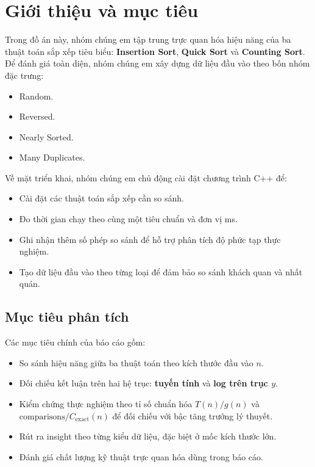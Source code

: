 \section{Giới thiệu và mục tiêu}

Trong đồ án này, nhóm chúng em tập trung trực quan hóa hiệu năng của ba thuật toán sắp xếp tiêu biểu:
\textbf{Insertion Sort}, \textbf{Quick Sort} và \textbf{Counting Sort}.
Để đánh giá toàn diện, nhóm chúng em xây dựng dữ liệu đầu vào theo bốn nhóm đặc trưng:
\begin{itemize}[leftmargin=1.2cm]
    \item Random.
    \item Reversed.
    \item Nearly Sorted.
    \item Many Duplicates.
\end{itemize}

Về mặt triển khai, nhóm chúng em chủ động cài đặt chương trình C++ để:
\begin{itemize}[leftmargin=1.2cm]
    \item Cài đặt các thuật toán sắp xếp cần so sánh.
    \item Đo thời gian chạy theo cùng một tiêu chuẩn và đơn vị ms.
    \item Ghi nhận thêm số phép so sánh để hỗ trợ phân tích độ phức tạp thực nghiệm.
    \item Tạo dữ liệu đầu vào theo từng loại để đảm bảo so sánh khách quan và nhất quán.
\end{itemize}

\subsection{Mục tiêu phân tích}

Các mục tiêu chính của báo cáo gồm:
\begin{itemize}[leftmargin=1.2cm]
    \item So sánh hiệu năng giữa ba thuật toán theo kích thước đầu vào $n$.
    \item Đối chiếu kết luận trên hai hệ trục: \textbf{tuyến tính} và \textbf{log trên trục $y$}.
    \item Kiểm chứng thực nghiệm theo tỉ số chuẩn hóa $T(n)/g(n)$ và $\text{comparisons}/C_{\text{exact}}(n)$ để đối chiếu với bậc tăng trưởng lý thuyết.
    \item Rút ra insight theo từng kiểu dữ liệu, đặc biệt ở mốc kích thước lớn.
    \item Đánh giá chất lượng kỹ thuật trực quan hóa dùng trong báo cáo.
\end{itemize}

